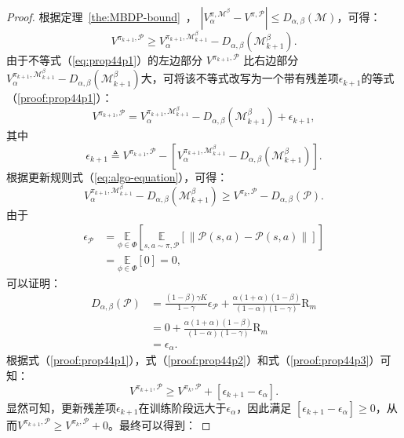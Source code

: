 \begin{proof}

根据定理~\ref{the:MBDP-bound}~， $\left|{V}_\alpha^{\pi, \mathcal{M}^\beta}-{V}^{\pi, \mathcal{P}}\right|\leq D_{\alpha,\beta}(\mathcal{M})$，可得：
\begin{equation}\label{eq:prop44p1}
{V}^{\pi_{k+1}, \mathcal{P}} \geq {V}_{\alpha}^{\pi_{k+1}, \mathcal{M}_{k+1}^\beta}-D_{\alpha,\beta}(\mathcal{M}_{k+1}^\beta).
\end{equation}
由于不等式（\ref{eq:prop44p1}）的左边部分 ${V}^{\pi_{k+1}, \mathcal{P}}$ 比右边部分${V}_{\alpha}^{\pi_{k+1}, \mathcal{M}_{k+1}^\beta}-D_{\alpha,\beta}(\mathcal{M}_{k+1}^\beta)$大，可将该不等式改写为一个带有残差项$\epsilon_{k+1}$的等式（\ref{proof:prop44p1}）：
\begin{equation}\label{proof:prop44p1}
{V}^{\pi_{k+1}, \mathcal{P}} = {V}_{\alpha}^{\pi_{k+1}, \mathcal{M}_{k+1}^\beta}-D_{\alpha,\beta}(\mathcal{M}_{k+1}^\beta) + \epsilon_{k+1},
\end{equation}
其中
\begin{equation}
\epsilon_{k+1} \triangleq {V}^{\pi_{k+1}, \mathcal{P}} - \left[{V}_{\alpha}^{\pi_{k+1}, \mathcal{M}_{k+1}^\beta} - D_{\alpha,\beta}(\mathcal{M}_{k+1}^\beta)\right].
\end{equation}
根据更新规则式（\ref{eq:algo-equation}），可得：
\begin{equation}\label{proof:prop44p2}
{V}_{\alpha}^{\pi_{k+1}, \mathcal{M}_{k+1}^\beta}-D_{\alpha,\beta}(\mathcal{M}_{k+1}^\beta) \geq {V}^{\pi_k,\mathcal{P}}-D_{\alpha,\beta}(\mathcal{P}).
\end{equation}
由于
\begin{equation}
\begin{aligned}
\epsilon_{\mathcal{P}} &= \underset{\phi\in\Phi}{\mathbb{E}}\left[\underset{s,a\sim \pi,\mathcal{P}}{\mathbb{E}}\left[\left\|\mathcal{P}(s, a)-\mathcal{P}(s, a)\right\|\right]\right]\\
&=\underset{\phi\in\Phi}{\mathbb{E}}\left[0\right] = 0,
\end{aligned}
\end{equation}
可以证明：
\begin{equation}
\begin{aligned}
D_{\alpha,\beta}(\mathcal{P}) &= \frac{(1-\beta)\gamma K}{1-\gamma}\epsilon_{\mathcal{P}}+\frac{\alpha(1+\alpha)(1-\beta)}{(1-\alpha)(1-\gamma)}\mathrm{R}_m\\
&=0+\frac{\alpha(1+\alpha)(1-\beta)}{(1-\alpha)(1-\gamma)}\mathrm{R}_m\\
&=\epsilon_\alpha.
\label{proof:prop44p3}
\end{aligned}
\end{equation}
根据式（\ref{proof:prop44p1}），式（\ref{proof:prop44p2}）和式（\ref{proof:prop44p3}）可知：
\begin{equation}
{V}^{\pi_{k+1}, \mathcal{P}}\geq {V}^{\pi_{k}, \mathcal{P}} + \left[\epsilon_{k+1} - \epsilon_\alpha\right].
\end{equation}
显然可知，更新残差项$\epsilon_{k+1}$在训练阶段远大于$\epsilon_\alpha$，因此满足 $\left[\epsilon_{k+1} - \epsilon_\alpha\right]\geq 0$，从而${V}^{\pi_{k+1}, \mathcal{P}}\geq{V}^{\pi_{k}, \mathcal{P}}+0$。最终可以得到：


\end{proof}
